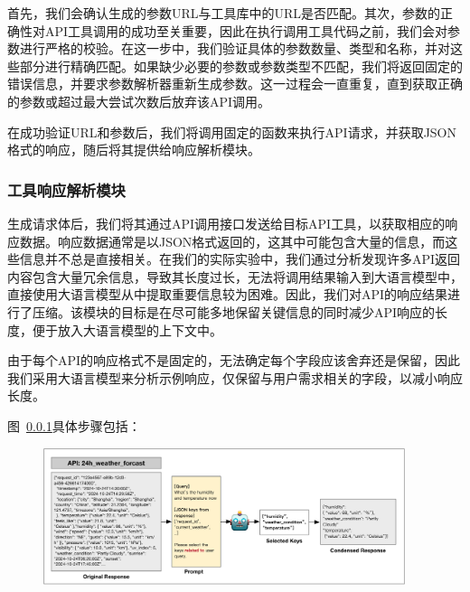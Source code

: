 首先，我们会确认生成的参数URL与工具库中的URL是否匹配。其次，参数的正确性对API工具调用的成功至关重要，因此在执行调用工具代码之前，我们会对参数进行严格的校验。在这一步中，我们验证具体的参数数量、类型和名称，并对这些部分进行精确匹配。如果缺少必要的参数或参数类型不匹配，我们将返回固定的错误信息，并要求参数解析器重新生成参数。这一过程会一直重复，直到获取正确的参数或超过最大尝试次数后放弃该API调用。

在成功验证URL和参数后，我们将调用固定的函数来执行API请求，并获取JSON格式的响应，随后将其提供给响应解析模块。

\subsubsection{工具响应解析模块}

生成请求体后，我们将其通过API调用接口发送给目标API工具，以获取相应的响应数据。响应数据通常是以JSON格式返回的，这其中可能包含大量的信息，而这些信息并不总是直接相关。在我们的实际实验中，我们通过分析发现许多API返回内容包含大量冗余信息，导致其长度过长，无法将调用结果输入到大语言模型中，直接使用大语言模型从中提取重要信息较为困难。因此，我们对API的响应结果进行了压缩。该模块的目标是在尽可能多地保留关键信息的同时减少API响应的长度，便于放入大语言模型的上下文中。

由于每个API的响应格式不是固定的，无法确定每个字段应该舍弃还是保留，因此我们采用大语言模型来分析示例响应，仅保留与用户需求相关的字段，以减小响应长度。

图~\ref{}具体步骤包括：

\begin{figure}[!htp]
  \vspace{1em}
  \centering
  \setlength{\abovecaptionskip}{10pt} %
  \includegraphics[height=4cm]{../assets/ch4-响应压缩.pdf}
  \label{fig:ch4-framework}
\end{figure}

